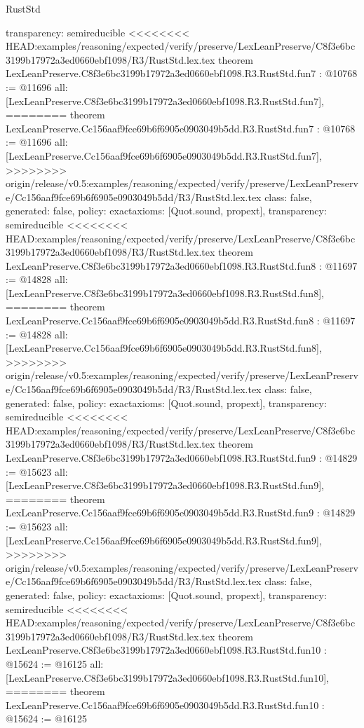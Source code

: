 \begin{lexlean}{RustStd}
\begin{coremodule}
{\begin{coremodule}
{{{{{{{{{{  transparency: semireducible
}
<<<<<<<< HEAD:examples/reasoning/expected/verify/preserve/LexLeanPreserve/C8f3e6bc3199b17972a3ed0660ebf1098/R3/RustStd.lex.tex
theorem LexLeanPreserve.C8f3e6bc3199b17972a3ed0660ebf1098.R3.RustStd.fun7 : @10768 := @11696 {
  all: [LexLeanPreserve.C8f3e6bc3199b17972a3ed0660ebf1098.R3.RustStd.fun7],
========
theorem LexLeanPreserve.Cc156aaf9fce69b6f6905e0903049b5dd.R3.RustStd.fun7 : @10768 := @11696 {
  all: [LexLeanPreserve.Cc156aaf9fce69b6f6905e0903049b5dd.R3.RustStd.fun7],
>>>>>>>> origin/release/v0.5:examples/reasoning/expected/verify/preserve/LexLeanPreserve/Cc156aaf9fce69b6f6905e0903049b5dd/R3/RustStd.lex.tex
  class: false,
  generated: false,
  policy: exact{axioms: [Quot.sound, propext]},
  transparency: semireducible
}
<<<<<<<< HEAD:examples/reasoning/expected/verify/preserve/LexLeanPreserve/C8f3e6bc3199b17972a3ed0660ebf1098/R3/RustStd.lex.tex
theorem LexLeanPreserve.C8f3e6bc3199b17972a3ed0660ebf1098.R3.RustStd.fun8 : @11697 := @14828 {
  all: [LexLeanPreserve.C8f3e6bc3199b17972a3ed0660ebf1098.R3.RustStd.fun8],
========
theorem LexLeanPreserve.Cc156aaf9fce69b6f6905e0903049b5dd.R3.RustStd.fun8 : @11697 := @14828 {
  all: [LexLeanPreserve.Cc156aaf9fce69b6f6905e0903049b5dd.R3.RustStd.fun8],
>>>>>>>> origin/release/v0.5:examples/reasoning/expected/verify/preserve/LexLeanPreserve/Cc156aaf9fce69b6f6905e0903049b5dd/R3/RustStd.lex.tex
  class: false,
  generated: false,
  policy: exact{axioms: [Quot.sound, propext]},
  transparency: semireducible
}
<<<<<<<< HEAD:examples/reasoning/expected/verify/preserve/LexLeanPreserve/C8f3e6bc3199b17972a3ed0660ebf1098/R3/RustStd.lex.tex
theorem LexLeanPreserve.C8f3e6bc3199b17972a3ed0660ebf1098.R3.RustStd.fun9 : @14829 := @15623 {
  all: [LexLeanPreserve.C8f3e6bc3199b17972a3ed0660ebf1098.R3.RustStd.fun9],
========
theorem LexLeanPreserve.Cc156aaf9fce69b6f6905e0903049b5dd.R3.RustStd.fun9 : @14829 := @15623 {
  all: [LexLeanPreserve.Cc156aaf9fce69b6f6905e0903049b5dd.R3.RustStd.fun9],
>>>>>>>> origin/release/v0.5:examples/reasoning/expected/verify/preserve/LexLeanPreserve/Cc156aaf9fce69b6f6905e0903049b5dd/R3/RustStd.lex.tex
  class: false,
  generated: false,
  policy: exact{axioms: [Quot.sound, propext]},
  transparency: semireducible
}
<<<<<<<< HEAD:examples/reasoning/expected/verify/preserve/LexLeanPreserve/C8f3e6bc3199b17972a3ed0660ebf1098/R3/RustStd.lex.tex
theorem LexLeanPreserve.C8f3e6bc3199b17972a3ed0660ebf1098.R3.RustStd.fun10 : @15624 := @16125 {
  all: [LexLeanPreserve.C8f3e6bc3199b17972a3ed0660ebf1098.R3.RustStd.fun10],
========
theorem LexLeanPreserve.Cc156aaf9fce69b6f6905e0903049b5dd.R3.RustStd.fun10 : @15624 := @16125 {
}}}}}}}}}}}}}}
\end{coremodule}}
\end{coremodule}
\end{lexlean}

